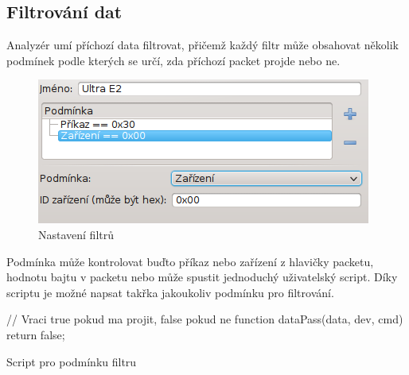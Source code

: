 \documentclass[12pt, a4paper, oneside]{article}
\begin{document}
\subsection{Filtrování dat}
Analyzér umí příchozí data filtrovat, přičemž každý filtr může obsahovat několik podmínek podle kterých se určí, zda příchozí packet projde nebo ne.
\begin{figure}[H]
\begin{center}
\includegraphics[scale=1]{img/filters.png}
\caption{Nastavení filtrů}
\end{center}
\end{figure}
Podmínka může kontrolovat buďto příkaz nebo zařízení z hlavičky packetu, hodnotu bajtu v packetu nebo může spustit jednoduchý uživatelský script. Díky scriptu je možné napsat takřka jakoukoliv podmínku pro filtrování.

\begin{listing}[H]
\begin{jscode}
// Vraci true pokud ma projit, false pokud ne
function dataPass(data, dev, cmd) {
    return false;
}
\end{jscode}
\caption{Script pro podmínku filtru}
\end{listing}

\end{document}
